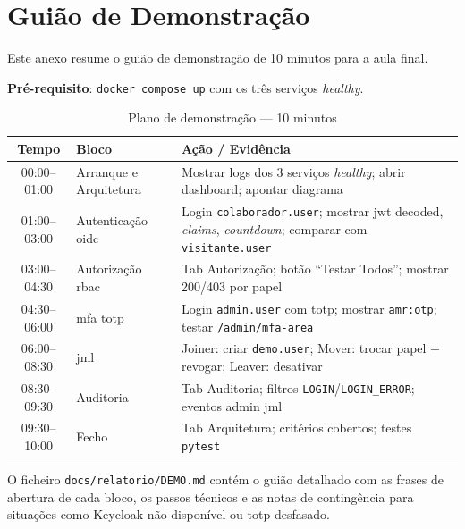 \chapter{Guião de Demonstração}
\label{anx:demo}

Este anexo resume o guião de demonstração de 10 minutos para a aula final.

\textbf{Pré-requisito}: \texttt{docker compose up} com os três serviços \textit{healthy}.

\begin{table}[h!]
\centering
\caption{Plano de demonstração — 10 minutos}
\label{tab:demo}
\begin{tabularx}{\textwidth}{|c|l|X|}
\hline
\textbf{Tempo} & \textbf{Bloco} & \textbf{Ação / Evidência} \\ \hline
00:00--01:00 & Arranque e Arquitetura & Mostrar logs dos 3 serviços \textit{healthy}; abrir dashboard; apontar diagrama \\ \hline
01:00--03:00 & Autenticação \gls{oidc} & Login \texttt{colaborador.user}; mostrar \gls{jwt} decoded, \textit{claims}, \textit{countdown}; comparar com \texttt{visitante.user} \\ \hline
03:00--04:30 & Autorização \gls{rbac} & Tab Autorização; botão ``Testar Todos''; mostrar 200/403 por papel \\ \hline
04:30--06:00 & \gls{mfa} \gls{totp} & Login \texttt{admin.user} com \gls{totp}; mostrar \texttt{amr:otp}; testar \texttt{/admin/mfa-area} \\ \hline
06:00--08:30 & \gls{jml} & Joiner: criar \texttt{demo.user}; Mover: trocar papel + revogar; Leaver: desativar \\ \hline
08:30--09:30 & Auditoria & Tab Auditoria; filtros \texttt{LOGIN}/\texttt{LOGIN\_ERROR}; eventos admin \gls{jml} \\ \hline
09:30--10:00 & Fecho & Tab Arquitetura; critérios cobertos; testes \texttt{pytest} \\ \hline
\end{tabularx}
\end{table}

O ficheiro \texttt{docs/relatorio/DEMO.md} contém o guião detalhado com as frases de abertura de cada bloco, os passos técnicos e as notas de contingência para situações como Keycloak não disponível ou \gls{totp} desfasado.
